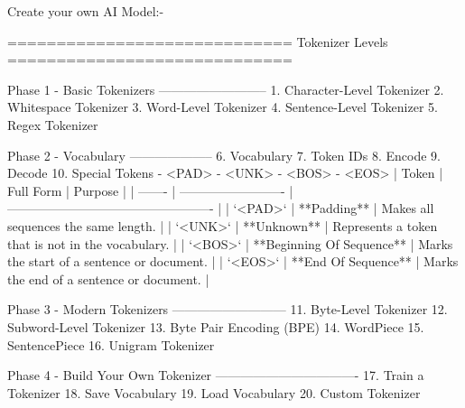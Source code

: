 Create your own AI Model:-

=============================
Tokenizer Levels
=============================

Phase 1 - Basic Tokenizers
--------------------------
1. Character-Level Tokenizer
2. Whitespace Tokenizer
3. Word-Level Tokenizer
4. Sentence-Level Tokenizer
5. Regex Tokenizer

Phase 2 - Vocabulary
--------------------
6. Vocabulary
7. Token IDs
8. Encode
9. Decode
10. Special Tokens
    - <PAD>
    - <UNK>
    - <BOS>
    - <EOS>
| Token   | Full Form                 | Purpose                                           |
| ------- | ------------------------- | ------------------------------------------------- |
| `<PAD>` | **Padding**               | Makes all sequences the same length.              |
| `<UNK>` | **Unknown**               | Represents a token that is not in the vocabulary. |
| `<BOS>` | **Beginning Of Sequence** | Marks the start of a sentence or document.        |
| `<EOS>` | **End Of Sequence**       | Marks the end of a sentence or document.          |


Phase 3 - Modern Tokenizers
---------------------------
11. Byte-Level Tokenizer
12. Subword-Level Tokenizer
13. Byte Pair Encoding (BPE)
14. WordPiece
15. SentencePiece
16. Unigram Tokenizer

Phase 4 - Build Your Own Tokenizer
----------------------------------
17. Train a Tokenizer
18. Save Vocabulary
19. Load Vocabulary
20. Custom Tokenizer